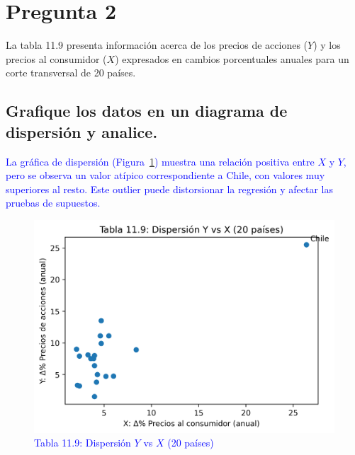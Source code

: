 \documentclass[10pt]{article}
\begin{document}
\section{Pregunta 2}
La tabla 11.9 presenta información acerca de los precios de acciones ($Y$) y los precios al consumidor ($X$) expresados en cambios porcentuales anuales para un corte transversal de 20 países.
    \subsection{Grafique los datos en un diagrama de dispersión y analice.}
    \textcolor{blue}{
    La gráfica de dispersión (Figura~\ref{fig:q2_scatter}) muestra una relación positiva entre $X$ y $Y$, pero se observa un valor atípico correspondiente a Chile, con valores muy superiores al resto. Este outlier puede distorsionar la regresión y afectar las pruebas de supuestos.
    \begin{figure}[H]
        \centering
        \includegraphics[width=0.7\linewidth]{../plots/python/ex2/q2_scatter_t119.png}
        \caption{Tabla 11.9: Dispersión $Y$ vs $X$ (20 países)}
        \label{fig:q2_scatter}
    \end{figure}
    }
\end{document}
